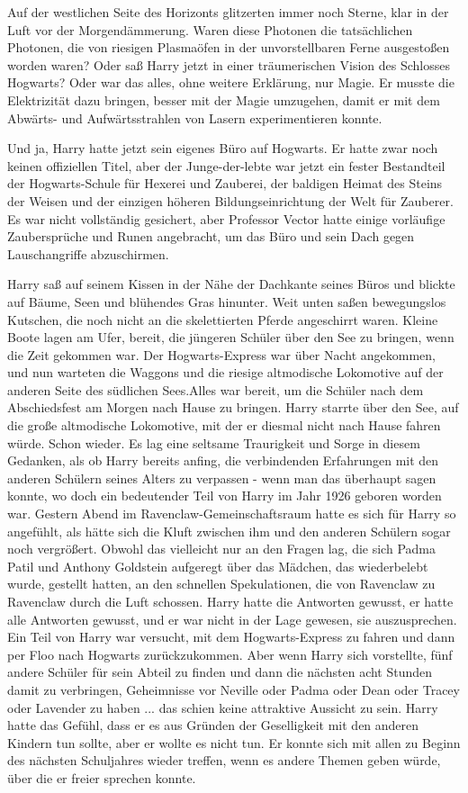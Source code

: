 Auf der westlichen Seite des Horizonts glitzerten immer noch Sterne, klar in der
Luft vor der Morgendämmerung. Waren diese Photonen die tatsächlichen Photonen,
die von riesigen Plasmaöfen in der unvorstellbaren Ferne ausgestoßen worden
waren? Oder saß Harry jetzt in einer träumerischen Vision des Schlosses
Hogwarts? Oder war das alles, ohne weitere Erklärung, \glqq{}nur Magie\grqq{}. Er
musste die Elektrizität dazu bringen, besser mit der Magie umzugehen, damit er
mit dem Abwärts- und Aufwärtsstrahlen von Lasern experimentieren konnte.

Und ja, Harry hatte jetzt sein eigenes Büro auf Hogwarts. Er hatte zwar noch
keinen offiziellen Titel, aber der Junge-der-lebte war jetzt ein fester
Bestandteil der Hogwarts-Schule für Hexerei und Zauberei, der baldigen Heimat
des Steins der Weisen und der einzigen höheren Bildungseinrichtung der Welt für
Zauberer. Es war nicht vollständig gesichert, aber Professor Vector hatte einige
vorläufige Zaubersprüche und Runen angebracht, um das Büro und sein Dach gegen
Lauschangriffe abzuschirmen.

Harry saß auf seinem Kissen in der Nähe der Dachkante seines Büros und blickte
auf Bäume, Seen und blühendes Gras hinunter. Weit unten saßen bewegungslos
Kutschen, die noch nicht an die skelettierten Pferde angeschirrt waren. Kleine
Boote lagen am Ufer, bereit, die jüngeren Schüler über den See zu bringen, wenn
die Zeit gekommen war. Der Hogwarts-Express war über Nacht angekommen, und nun
warteten die Waggons und die riesige altmodische Lokomotive auf der anderen
Seite des südlichen Sees.Alles war bereit, um die Schüler nach dem Abschiedsfest
am Morgen nach Hause zu bringen. Harry starrte über den See, auf die große
altmodische Lokomotive, mit der er diesmal nicht nach Hause fahren würde. Schon
wieder. Es lag eine seltsame Traurigkeit und Sorge in diesem Gedanken, als ob
Harry bereits anfing, die verbindenden Erfahrungen mit den anderen Schülern
seines Alters zu verpassen - wenn man das überhaupt sagen konnte, wo doch ein
bedeutender Teil von Harry im Jahr 1926 geboren worden war. Gestern Abend im
Ravenclaw-Gemeinschaftsraum hatte es sich für Harry so angefühlt, als hätte sich
die Kluft zwischen ihm und den anderen Schülern sogar noch vergrößert. Obwohl
das vielleicht nur an den Fragen lag, die sich Padma Patil und Anthony Goldstein
aufgeregt über das Mädchen, das wiederbelebt wurde, gestellt hatten, an den
schnellen Spekulationen, die von Ravenclaw zu Ravenclaw durch die Luft schossen.
Harry hatte die Antworten gewusst, er hatte alle Antworten gewusst, und er war
nicht in der Lage gewesen, sie auszusprechen. Ein Teil von Harry war versucht,
mit dem Hogwarts-Express zu fahren und dann per Floo nach Hogwarts
zurückzukommen. Aber wenn Harry sich vorstellte, fünf andere Schüler für sein
Abteil zu finden und dann die nächsten acht Stunden damit zu verbringen,
Geheimnisse vor Neville oder Padma oder Dean oder Tracey oder Lavender zu
haben ... das schien keine attraktive Aussicht zu sein. Harry hatte das Gefühl,
dass er es aus Gründen der Geselligkeit mit den anderen Kindern tun sollte, aber
er wollte es nicht tun. Er konnte sich mit allen zu Beginn des nächsten
Schuljahres wieder treffen, wenn es andere Themen geben würde, über die er
freier sprechen konnte.

